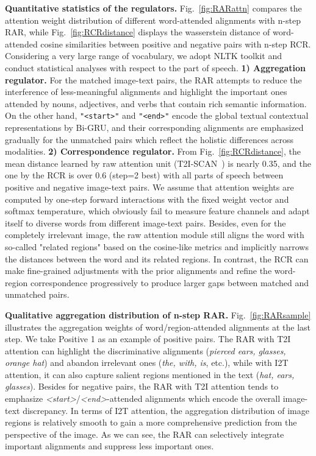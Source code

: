 \documentclass[journal]{IEEEtran}\newcommand{\ignore}[1]{}
\begin{document}
\textbf{Quantitative statistics of the regulators.}
Fig.~\ref{fig:RARattn} compares the attention weight distribution of different word-attended alignments with n-step RAR, while Fig.~\ref{fig:RCRdistance} displays the wasserstein distance of word-attended cosine similarities between positive and negative pairs with n-step RCR. Considering a very large range of vocabulary, we adopt NLTK toolkit and conduct statistical analyses with respect to the part of speech.
\textbf{1) Aggregation regulator.} For the matched image-text pairs, the RAR attempts to reduce the interference of less-meaningful alignments and highlight the important ones attended by nouns, adjectives, and verbs that contain rich semantic information. On the other hand, \texttt{"<start>"} and \texttt{"<end>"} encode the global textual contextual representations by Bi-GRU, and their corresponding alignments are emphasized gradually for the unmatched pairs which reflect the holistic differences 
across modalities. 
\textbf{2) Correspondence regulator.} From Fig.~\ref{fig:RCRdistance}, the mean distance learned by raw attention unit (T2I-SCAN~\cite{SCAN}) is nearly 0.35, and the one by the RCR is over 0.6 (step=2 best) with all parts of speech between positive and negative image-text pairs. We assume that attention weights are computed by one-step forward interactions with the fixed weight vector and softmax temperature, which obviously fail to measure feature channels and adapt itself to diverse words from different image-text pairs. Besides, even for the completely irrelevant image, the raw attention module still aligns the word with so-called "related regions" based on the cosine-like metrics and implicitly narrows the distances between the word and its related regions. In contrast, the RCR can make fine-grained adjustments with the prior alignments and refine the word-region correspondence progressively to produce larger gaps between matched and unmatched pairs.

\textbf{Qualitative aggregation distribution of n-step RAR.}
Fig.~\ref{fig:RARsample} illustrates the aggregation weights of word/region-attended alignments at the last step. We take Positive 1 as an example of positive pairs. The RAR with T2I attention can highlight the discriminative alignments (\textit{pierced ears, glasses, orange hat}) and abandon irrelevant ones (\textit{the, with, is}, etc.), while with I2T attention, it can also capture salient regions mentioned in the text (\textit{hat, ears, glasses}). Besides for negative pairs, the RAR with T2I attention tends to emphasize \textit{<start>}/\textit{<end>}-attended alignments which encode the overall image-text discrepancy. In terms of I2T attention, the aggregation distribution of image regions is relatively smooth to gain a more comprehensive prediction from the perspective of the image. As we can see, the RAR can selectively integrate important alignments and suppress less important ones.
\end{document}
